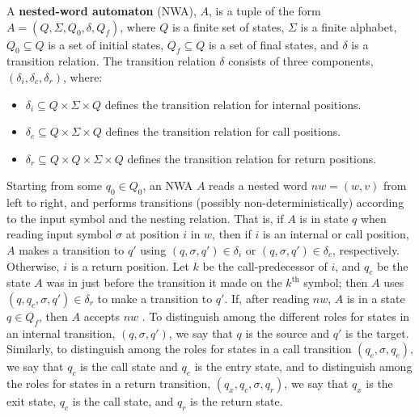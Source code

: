 \documentclass{llncs}
\begin{document}
\begin{definition}
\label{De:NWA}
A \textbf{nested-word automaton} (NWA), $A$, is a tuple of the form $A=(Q, \Sigma, Q_0, \delta, Q_f)$, where $Q$ is a finite set of states, $\Sigma$ is a finite alphabet, $Q_0 \subseteq Q$ is a set of initial states, $Q_f \subseteq Q$ is a set of final states, and $\delta$ is a transition relation. The transition relation $\delta$ consists of three components, $(\delta_i, \delta_c, \delta_r)$, where:
\begin{itemize}
    \item
    $\delta_i \subseteq Q \times \Sigma \times Q$ defines the transition
    relation for internal positions.
    
    \item
    $\delta_c \subseteq Q \times \Sigma \times Q$ defines the transition
    relation for call positions.
    
    \item
    $\delta_r \subseteq Q \times Q \times \Sigma \times Q$ defines the
    transition relation for return positions.
    
\end{itemize}
\end{definition}

Starting from some $q_0 \in Q_0$, an NWA $A$ reads a nested word $nw = (w,v)$ from left to right, and performs transitions (possibly non-deterministically) according to the input symbol and the nesting relation. That is, if $A$ is in state $q$ when reading input symbol $\sigma$ at position $i$ in $w$, then if $i$ is an internal or call position, $A$ makes a transition to $q'$ using $(q,\sigma,q') \in \delta_i$ or $(q,\sigma,q') \in \delta_c$, respectively. Otherwise, $i$ is a return position. Let $k$ be the call-predecessor of $i$, and $q_c$ be the state $A$ was in just before the transition it made on the $k^{\text{th}}$ symbol; then $A$ uses $(q,q_c,\sigma,q') \in \delta_r$ to make a transition to $q'$.  If, after reading $nw$, $A$ is in a state $q \in Q_f$, then $A$ accepts $nw$ \cite{DLT:AM2006}.  To distinguish among the different roles for states in an internal transition, $(q,\sigma,q')$, we say that $q$ is the source and $q'$ is the target.  Similarly, to distinguish among the roles for states in a call transition $(q_c,\sigma,q_e)$, we say that $q_c$ is the call state and $q_e$ is the entry state, and to distinguish among the roles for states in a return transition, $(q_x,q_c,\sigma,q_r)$, we say that $q_x$ is the exit state, $q_c$ is the call state, and $q_r$ is the return state.
\end{document}
